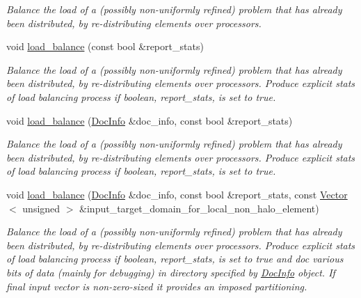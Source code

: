 \begin{DoxyCompactItemize}
\begin{DoxyCompactList}\small\item\em Balance the load of a (possibly non-\/uniformly refined) problem that has already been distributed, by re-\/distributing elements over processors. \end{DoxyCompactList}\item 
void \hyperlink{classoomph_1_1Problem_a1d78ad991995dca1f71ae83ccaa83e25}{load\+\_\+balance} (const bool \&report\+\_\+stats)
\begin{DoxyCompactList}\small\item\em Balance the load of a (possibly non-\/uniformly refined) problem that has already been distributed, by re-\/distributing elements over processors. Produce explicit stats of load balancing process if boolean, report\+\_\+stats, is set to true. \end{DoxyCompactList}\item 
void \hyperlink{classoomph_1_1Problem_abc2a02507c85322024b9859bfbd5b7bf}{load\+\_\+balance} (\hyperlink{classoomph_1_1DocInfo}{Doc\+Info} \&doc\+\_\+info, const bool \&report\+\_\+stats)
\begin{DoxyCompactList}\small\item\em Balance the load of a (possibly non-\/uniformly refined) problem that has already been distributed, by re-\/distributing elements over processors. Produce explicit stats of load balancing process if boolean, report\+\_\+stats, is set to true. \end{DoxyCompactList}\item 
void \hyperlink{classoomph_1_1Problem_a7492ddb5663552ce8f61f1ef73c86a9d}{load\+\_\+balance} (\hyperlink{classoomph_1_1DocInfo}{Doc\+Info} \&doc\+\_\+info, const bool \&report\+\_\+stats, const \hyperlink{classoomph_1_1Vector}{Vector}$<$ unsigned $>$ \&input\+\_\+target\+\_\+domain\+\_\+for\+\_\+local\+\_\+non\+\_\+halo\+\_\+element)
\begin{DoxyCompactList}\small\item\em Balance the load of a (possibly non-\/uniformly refined) problem that has already been distributed, by re-\/distributing elements over processors. Produce explicit stats of load balancing process if boolean, report\+\_\+stats, is set to true and doc various bits of data (mainly for debugging) in directory specified by \hyperlink{classoomph_1_1DocInfo}{Doc\+Info} object. If final input vector is non-\/zero-\/sized it provides an imposed partitioning. \end{DoxyCompactList}\item 

\end{DoxyCompactItemize}
